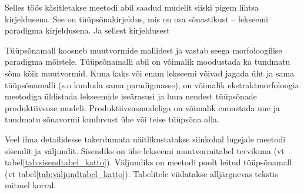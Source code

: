 \documentclass[12pt,a4paper]{article}
\begin{document}
Selles töös käsitletakse meetodi abil saadud mudelit siiski pigem lihtsa kirjeldusena. See on tüüpsõnakirjeldus, mis on osa sõnastikust -- lekseemi paradigma kirjeldusena. Ja sellest kirjeldusest 

Tüüpsõna\-mall koosneb muutvormide mallidest ja vastab seega morfoloogilise paradigma mõistele. 
Tüüpsõna\-malli abil on võimalik moodustada ka tundmatu sõna kõik muutvormid.
Kuna kaks või enam lekseemi võivad jagada üht ja sama tüüpsõna\-malli (s.o kuuluda sama paradigmasse), on võimalik ekstrakt\-morfoloogia meetodiga üldistada lekseemide iseärasusi ja luua nendest tüüpsõnade produktiivsuse mudeli. Produktiivsus\-mudeliga on võimalik ennustada uue ja tundmatu sõnavormi kuuluvust ühe või teise tüüpsõna alla. 


Veel ilma detailidesse takerdumata näitlikustatakse siinkohal lugejale meetodi sisendit ja väljundit. Sisendiks on ühe lekseemi muutvormitabel tervikuna (vt tabel\nobreakspace \ref{tab:sisendtabel_katto}). Väljundiks on meetodi poolt leitud tüüpsõnamall (vt tabel\nobreakspace \ref{tab:väljundtabel_katto}). Tabelitele viidatakse alljärgnevas tekstis mitmel korral.
\end{document}
